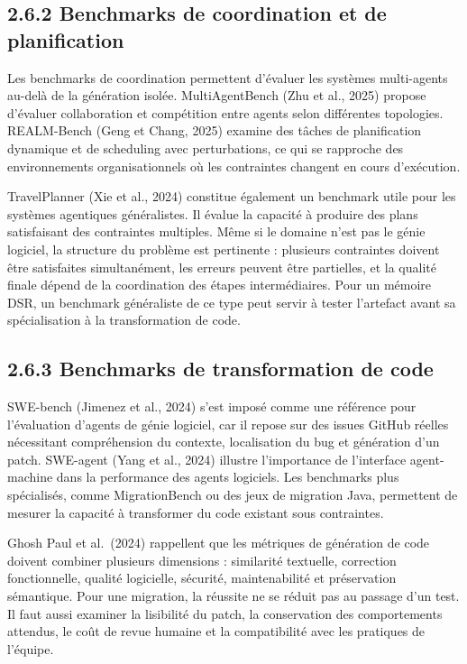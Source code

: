\subsection{2.6.2 Benchmarks de coordination et de planification}\label{benchmarks-de-coordination-et-de-planification}

Les benchmarks de coordination permettent d'évaluer les systèmes multi-agents au-delà de la génération isolée. MultiAgentBench (Zhu et al., 2025) propose d'évaluer collaboration et compétition entre agents selon différentes topologies. REALM-Bench (Geng et Chang, 2025) examine des tâches de planification dynamique et de scheduling avec perturbations, ce qui se rapproche des environnements organisationnels où les contraintes changent en cours d'exécution.

TravelPlanner (Xie et al., 2024) constitue également un benchmark utile pour les systèmes agentiques généralistes. Il évalue la capacité à produire des plans satisfaisant des contraintes multiples. Même si le domaine n'est pas le génie logiciel, la structure du problème est pertinente : plusieurs contraintes doivent être satisfaites simultanément, les erreurs peuvent être partielles, et la qualité finale dépend de la coordination des étapes intermédiaires. Pour un mémoire DSR, un benchmark généraliste de ce type peut servir à tester l'artefact avant sa spécialisation à la transformation de code.

\subsection{2.6.3 Benchmarks de transformation de code}\label{benchmarks-de-transformation-de-code}

SWE-bench (Jimenez et al., 2024) s'est imposé comme une référence pour l'évaluation d'agents de génie logiciel, car il repose sur des issues GitHub réelles nécessitant compréhension du contexte, localisation du bug et génération d'un patch. SWE-agent (Yang et al., 2024) illustre l'importance de l'interface agent-machine dans la performance des agents logiciels. Les benchmarks plus spécialisés, comme MigrationBench ou des jeux de migration Java, permettent de mesurer la capacité à transformer du code existant sous contraintes.

Ghosh Paul et al.~(2024) rappellent que les métriques de génération de code doivent combiner plusieurs dimensions : similarité textuelle, correction fonctionnelle, qualité logicielle, sécurité, maintenabilité et préservation sémantique. Pour une migration, la réussite ne se réduit pas au passage d'un test. Il faut aussi examiner la lisibilité du patch, la conservation des comportements attendus, le coût de revue humaine et la compatibilité avec les pratiques de l'équipe.

